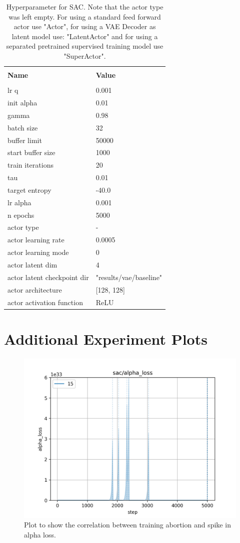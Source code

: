 \begin{table}[h]
    \label{tab:SAC_Baseline_Hyperparameters}
    \begin{center}
        \begin{tabular}{ l | l }
        \hline \\
        \textbf{Name} & \textbf{Value} \\
        \hline \\
        lr q & 0.001 \\
        init alpha & 0.01 \\
        gamma & 0.98\\
        batch size & 32 \\
        buffer limit & 50000 \\
        start buffer size & 1000 \\
        train iterations & 20 \\
        tau & 0.01 \\
        target entropy & -40.0 \\
        lr alpha & 0.001 \\
        n epochs & 5000 \\
        actor type & - \\
        actor learning rate & 0.0005 \\
        actor learning mode & 0 \\
        actor latent dim & 4 \\
        actor latent checkpoint dir & "results/vae/baseline" \\
        actor architecture & [128, 128] \\
        actor activation function & ReLU \\
        \end{tabular}
    \end{center}
    \caption[SAC Hyperparameter]{Hyperparameter for SAC. Note that the actor type was left empty. For using a standard feed forward actor use "Actor", for using a VAE Decoder as  latent model use: "LatentActor" and for using a separated pretrained supervised training model use "SuperActor".}
\end{table}

\section{Additional Experiment Plots}

\begin{figure}[h]
    \begin{center}
        \includegraphics[width=0.23 \linewidth]{figures/appendix/alpha_loss_15.png}
    \end{center}
    \caption[alpha loss with $N = 15$]{Plot to show the correlation between training abortion and spike in alpha loss.}
    \label{fig:alpha_loss_15}
\end{figure}

